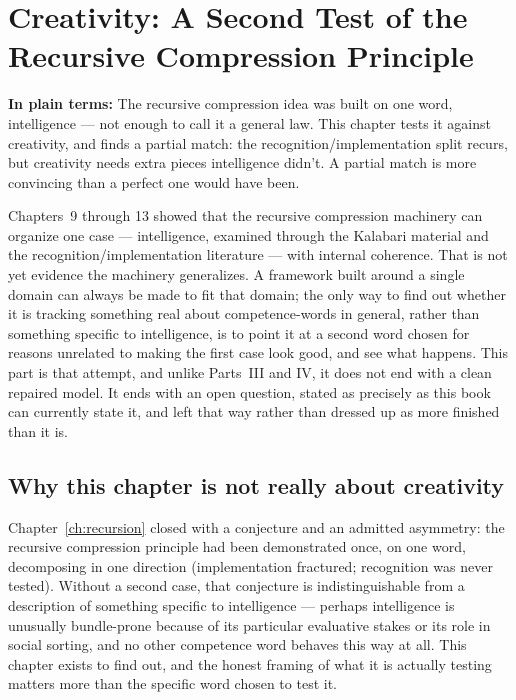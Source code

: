 \chapter{Creativity: A Second Test of the Recursive Compression Principle}
\label{ch:creativity}

\begin{plainlanguage}
\textbf{In plain terms:} The recursive compression idea was built on one word, intelligence — not enough to call it a general law. This chapter tests it against creativity, and finds a partial match: the recognition/implementation split recurs, but creativity needs extra pieces intelligence didn't. A partial match is more convincing than a perfect one would have been.
\end{plainlanguage}

\begin{chapternote}
Chapters~9 through 13 showed that the recursive compression machinery can organize one case --- intelligence, examined through the Kalabari material and the recognition/implementation literature --- with internal coherence. That is not yet evidence the machinery generalizes. A framework built around a single domain can always be made to fit that domain; the only way to find out whether it is tracking something real about competence-words in general, rather than something specific to intelligence, is to point it at a second word chosen for reasons unrelated to making the first case look good, and see what happens. This part is that attempt, and unlike Parts~III and IV, it does not end with a clean repaired model. It ends with an open question, stated as precisely as this book can currently state it, and left that way rather than dressed up as more finished than it is.
\end{chapternote}

\section{Why this chapter is not really about creativity}

Chapter~\ref{ch:recursion} closed with a conjecture and an admitted asymmetry: the recursive compression principle had been demonstrated once, on one word, decomposing in one direction (implementation fractured; recognition was never tested). Without a second case, that conjecture is indistinguishable from a description of something specific to intelligence --- perhaps intelligence is unusually bundle-prone because of its particular evaluative stakes or its role in social sorting, and no other competence word behaves this way at all. This chapter exists to find out, and the honest framing of what it is actually testing matters more than the specific word chosen to test it.

